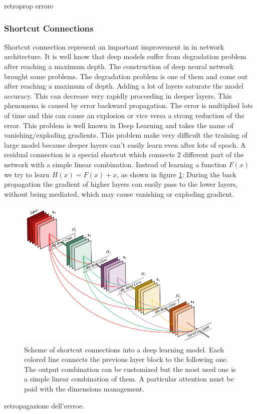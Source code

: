 \documentclass[a4paper, 10pt]{book}
\begin{document}
    retroprop errore

\subsubsection{Shortcut Connections}

Shortcut connection represent an important improvement in in network architecture. It is well know that deep models suffer from degradation problem after reaching  a maximum depth. The construction of deep neural network brought some problems. The degradation problem is one of them and come out after reaching a maximum of depth. Adding a lot of layers saturate the model accuracy. This can decrease very rapidly proceeding in deeper layers.
This phenomena is caused by  error backward propagation. The error is multiplied lots of time and this can cause an explosion or vice versa a strong reduction of the error. This problem is well known in Deep Learning and takes the name of vanishing/exploding gradients.
This problem make very difficult the training of large model because deeper layers can’t easily learn even after lots of epoch.
A residual connection is a special shortcut which connects 2 different part of the network with a simple linear combination. Instead of learning a function  $ F(x)$  we try to learn  
$H(x) = F(x) + x$, as shown in figure \ref{fig:shortcut}:
During the back propagation the gradient of higher layers can easily pass to the lower layers, without being mediated, which may cause vanishing or exploding gradient.
\begin{figure}[htp]
    \centering
    \includegraphics[width=10cm]{shortcut_layer.png}
    \caption{Scheme of shortcut connections into a deep learning model.
Each colored line connects the previous layer block to the following one.
The output combination can be customized but the most used one is a simple linear combination of them.
A particular attention must be paid with the dimensions management.
}
    \label{fig:shortcut}
\end{figure}
retropagazione dell'errroe.
\\
\\
\\
\end{document}
